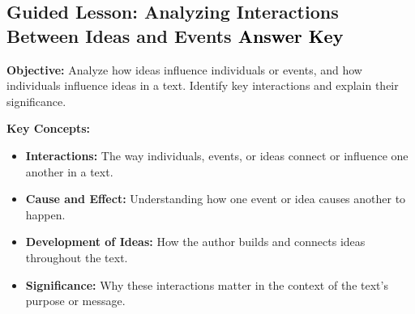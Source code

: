 \documentclass[12pt]{article}
\begin{document}
\subsection*{Guided Lesson: Analyzing Interactions Between Ideas and Events \textcolor{black}{Answer Key}}
\onehalfspacing

\begin{tcolorbox}[colframe=black!40, colback=gray!5, 
coltitle=black, colbacktitle=black!20, fonttitle=\bfseries\Large, 
title=Learning Objective, halign title=center, left=5pt, right=5pt, top=5pt, bottom=15pt]
\textbf{Objective:} Analyze how ideas influence individuals or events, and how individuals influence ideas in a text. Identify key interactions and explain their significance.
\end{tcolorbox}

\vspace{1em}

\begin{tcolorbox}[colframe=black!60, colback=white, 
coltitle=black, colbacktitle=black!15, fonttitle=\bfseries\Large, 
title=Key Concepts and Vocabulary, halign title=center, left=10pt, right=10pt, top=10pt, bottom=15pt]
\textbf{Key Concepts:}
\begin{itemize}
    \item \textbf{Interactions:} The way individuals, events, or ideas connect or influence one another in a text.
    \item \textbf{Cause and Effect:} Understanding how one event or idea causes another to happen.
    \item \textbf{Development of Ideas:} How the author builds and connects ideas throughout the text.
    \item \textbf{Significance:} Why these interactions matter in the context of the text's purpose or message.
\end{itemize}
\end{tcolorbox}

\vspace{1em}
\end{document}
